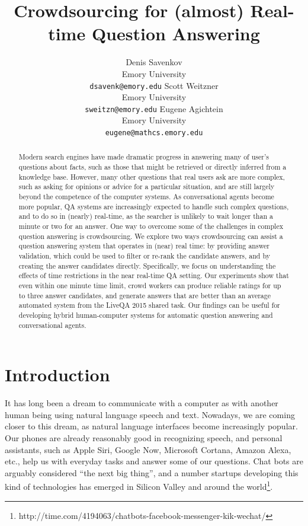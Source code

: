 \documentclass[11pt,letterpaper]{article}
\title{Crowdsourcing for (almost) Real-time Question Answering}
\author{Denis Savenkov \\ Emory University \\ {\tt dsavenk@emory.edu} 
  \And Scott Weitzner \\ Emory University \\ {\tt sweitzn@emory.edu}
  \And Eugene Agichtein \\ Emory University \\ {\tt eugene@mathcs.emory.edu}
}
\date{}
\begin{document}
\maketitle

\begin{abstract}

Modern search engines have made dramatic progress in answering many of user's questions about facts, such as those that might be retrieved or directly inferred from a knowledge base.
However, many other questions that real users ask are more complex, such as asking for opinions or advice for a particular situation, and are still largely beyond the competence of the computer systems.
As conversational agents become more popular, QA systems are increasingly expected to handle such complex questions, and to do so in (nearly) real-time, as the searcher is unlikely to wait longer than a minute or two for an answer.
One way to overcome some of the challenges in complex question answering is crowdsourcing.
We explore two ways crowdsourcing can assist a question answering system that operates in (near) real time: by providing answer validation, which could be used to filter or re-rank the candidate answers, and by creating the answer candidates directly.
Specifically, we focus on understanding the effects of time restrictions in the near real-time QA setting.
Our experiments show that even within one minute time limit, crowd workers can produce reliable ratings for up to three answer candidates, and generate answers that are better than an average automated system from the LiveQA 2015 shared task.
Our findings can be useful for developing hybrid human-computer systems for automatic question answering and conversational agents.

\end{abstract}

\section{Introduction}
\label{sec:introduction}

It has long been a dream to communicate with a computer as with another human being using natural language speech and text.
Nowadays, we are coming closer to this dream, as natural language interfaces become increasingly popular.
Our phones are already reasonably good in recognizing speech, and personal assistants, such as Apple Siri, Google Now, Microsoft Cortana, Amazon Alexa, etc., help us with everyday tasks and answer some of our questions.
Chat bots are arguably considered ``the next big thing'', and a number startups developing this kind of technologies has emerged in Silicon Valley and around the world\footnote{http://time.com/4194063/chatbots-facebook-messenger-kik-wechat/}.
\end{document}
